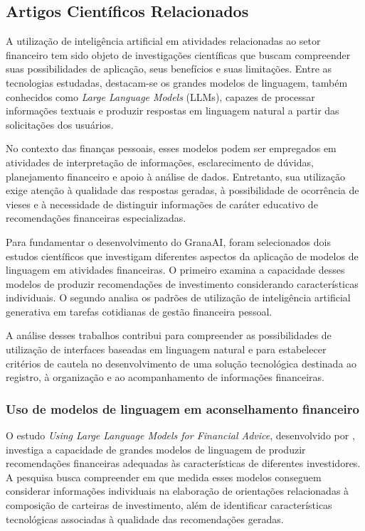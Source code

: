 \subsection{Artigos Científicos Relacionados}

A utilização de inteligência artificial em atividades relacionadas ao setor financeiro tem sido objeto de investigações científicas que buscam compreender suas possibilidades de aplicação, seus benefícios e suas limitações. Entre as tecnologias estudadas, destacam-se os grandes modelos de linguagem, também conhecidos como \textit{Large Language Models} (LLMs), capazes de processar informações textuais e produzir respostas em linguagem natural a partir das solicitações dos usuários.

No contexto das finanças pessoais, esses modelos podem ser empregados em atividades de interpretação de informações, esclarecimento de dúvidas, planejamento financeiro e apoio à análise de dados. Entretanto, sua utilização exige atenção à qualidade das respostas geradas, à possibilidade de ocorrência de vieses e à necessidade de distinguir informações de caráter educativo de recomendações financeiras especializadas.

Para fundamentar o desenvolvimento do GranaAI, foram selecionados dois estudos científicos que investigam diferentes aspectos da aplicação de modelos de linguagem em atividades financeiras. O primeiro examina a capacidade desses modelos de produzir recomendações de investimento considerando características individuais. O segundo analisa os padrões de utilização de inteligência artificial generativa em tarefas cotidianas de gestão financeira pessoal.

A análise desses trabalhos contribui para compreender as possibilidades de utilização de interfaces baseadas em linguagem natural e para estabelecer critérios de cautela no desenvolvimento de uma solução tecnológica destinada ao registro, à organização e ao acompanhamento de informações financeiras.

\subsubsection{Uso de modelos de linguagem em aconselhamento financeiro}

O estudo \textit{Using Large Language Models for Financial Advice}, desenvolvido por , investiga a capacidade de grandes modelos de linguagem de produzir recomendações financeiras adequadas às características de diferentes investidores. A pesquisa busca compreender em que medida esses modelos conseguem considerar informações individuais na elaboração de orientações relacionadas à composição de carteiras de investimento, além de identificar características tecnológicas associadas à qualidade das recomendações geradas.

